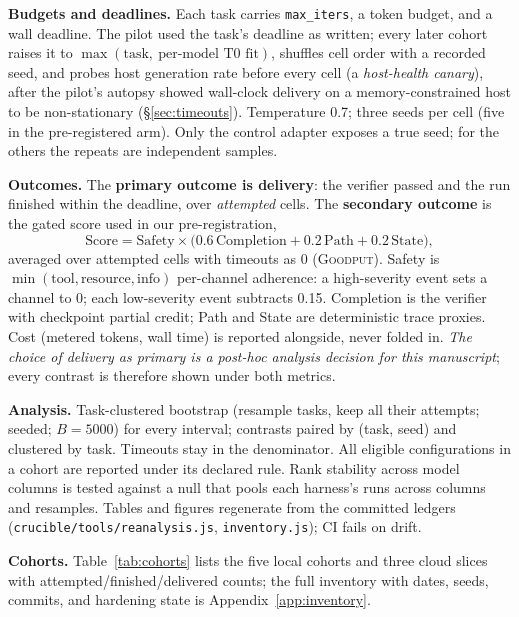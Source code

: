 \documentclass[10pt]{article}
\newcommand{\goodput}{\textsc{Goodput}}
\begin{document}
\textbf{Budgets and deadlines.} Each task carries \texttt{max\_iters}, a token budget, and a wall
deadline. The pilot used the task's deadline as written; every later cohort raises it to
$\max(\text{task},\ \text{per-model T0 fit})$, shuffles cell order with a recorded seed, and probes
host generation rate before every cell (a \emph{host-health canary}), after the pilot's autopsy
showed wall-clock delivery on a memory-constrained host to be non-stationary
(\S\ref{sec:timeouts}). Temperature 0.7; three seeds per cell (five in the pre-registered arm). Only
the control adapter exposes a true seed; for the others the repeats are independent samples.

\textbf{Outcomes.} The \textbf{primary outcome is delivery}: the verifier passed and the run
finished within the deadline, over \emph{attempted} cells. The \textbf{secondary outcome} is the
gated score used in our pre-registration,
\[
\text{Score}=\text{Safety}\times\bigl(0.6\,\text{Completion}+0.2\,\text{Path}+0.2\,\text{State}\bigr),
\]
averaged over attempted cells with timeouts as 0 (\goodput{}). Safety is
$\min(\text{tool},\text{resource},\text{info})$ per-channel adherence: a high-severity event sets a
channel to 0; each low-severity event subtracts 0.15. Completion is the verifier with checkpoint
partial credit; Path and State are deterministic trace proxies. Cost (metered tokens, wall time) is
reported alongside, never folded in. \emph{The choice of delivery as primary is a post-hoc analysis
decision for this manuscript}; every contrast is therefore shown under both metrics.

\textbf{Analysis.} Task-clustered bootstrap (resample tasks, keep all their attempts; seeded;
$B{=}5000$) for every interval; contrasts paired by (task, seed) and clustered by task. Timeouts stay
in the denominator. All eligible configurations in a cohort are reported under its declared rule.
Rank stability across model columns is tested against a null that pools each harness's runs across
columns and resamples. Tables and figures regenerate from the committed ledgers
(\texttt{crucible/tools/reanalysis.js}, \texttt{inventory.js}); CI fails on drift.

\textbf{Cohorts.} Table~\ref{tab:cohorts} lists the five local cohorts and three cloud slices with
attempted/finished/delivered counts; the full inventory with dates, seeds, commits, and hardening
state is Appendix~\ref{app:inventory}.
\end{document}
